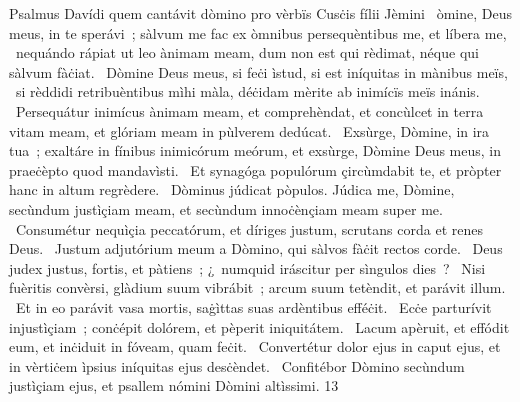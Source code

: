 { Psalmus Davídi quem cantávit dòmino pro vèrbïs Cusċis fílii Jèmini}
{%
~òmine, Deus meus, in te sperávi~; sàlvum me fac ex òmnibus persequèntibus me, et líbera me,
~nequándo rápiat ut leo ànimam meam, dum non est qui rèdimat, néque qui sàlvum fàċiat.
~Dòmine Deus meus, si feċi ìstud, si est iníquitas in mànibus meïs,
~si rèddidi retribuèntibus mìhi màla, déċidam mèrite ab inimícïs meïs inánis.
~Persequátur inimícus ànimam meam, et comprehèndat, et concùlcet in terra vitam meam, et glóriam meam in pùlverem dedúcat.
~Exsùrge, Dòmine, in ira tua~; exaltáre in fínibus inimicórum meórum, et exsùrge, Dòmine Deus meus, in praeċèpto quod mandavìsti.
~Et synagóga populórum çircùmdabit te, et pròpter hanc in altum regrèdere.
~Dòminus júdicat pòpulos. Júdica me, Dòmine, secùndum justìçiam meam, et secùndum innoċènçiam meam super me.
~Consumétur nequìçia peccatórum, et díriges justum, scrutans corda et renes Deus.
~Justum adjutórium meum a Dòmino, qui sàlvos fàċit rectos corde.
~Deus judex justus, fortis, et pàtiens~; ¿~numquid iráscitur per sìngulos dies~?
~Nisi fuèritis convèrsi, glàdium suum vibrábit~; arcum suum tetèndit, et parávit illum.
~Et in eo parávit vasa mortis, saġìttas suas ardèntibus efféċit.
~Ecċe parturívit injustìçiam~; conċépit dolórem, et pèperit iniquitátem.
~Lacum apèruit, et effódit eum, et inċiduit in fóveam, quam feċit.
~Convertétur dolor ejus in caput ejus, et in vèrtiċem ìpsius iníquitas ejus desċèndet.
~Confitébor Dòmino secùndum justìçiam ejus, et psallem nómini Dòmini altìssimi.
}
{1}{3}
